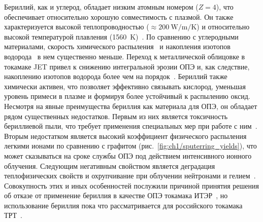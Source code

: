 Бериллий, как и углерод, обладает низким атомным номером ($Z=4$), что обеспечивает относительно хорошую совместимость с плазмой. Он также характеризуется высокой теплопроводностью (\( \approx \SI{200}{\watt\per\meter\per\K} \)) и относительно высокой температурой плавления (\SI{1560}{\kelvin})~\cite{Ho1974}. По сравнению с углеродными материалами, скорость химического распыления~\cite{Brezinsek2014} и накопления изотопов водорода~\cite{DeTemmerman2021} в нем существенно меньше. Переход к металлической облицовке в токамаке JET привел к снижению интегральной эрозии ОПЭ и, как следствие, накоплению изотопов водорода более чем на порядок~\cite{Brezinsek2015}. Бериллий также химически активен, что позволяет эффективно связывать кислород, уменьшая уровень примеси в плазме и формируя более устойчивый к распылению оксид. Несмотря на явные преимущества бериллия как материала для ОПЭ, он обладает рядом существенных недостатков. Первым из них является токсичность бериллиевой пыли, что требует применения специальных мер при работе с ним~\cite{Strupp2011}. Вторым недостатком является высокий коэффициент физического распыления легкими ионами по сравнению с графитом (рис.~\cref{fig:ch1/sputerring_yields}), что может сказываться на сроке службы ОПЭ под действием интенсивного ионного облучения. Следующим негативным свойством является деградация теплофизических свойств и охрупчивание при облучении нейтронами и гелием~\cite{Kesternich2003,Gilbert2012}. Совокупность этих и иных особенностей послужили причиной принятия решения об отказе от применение бериллия в качестве ОПЭ токамака ИТЭР~\cite{Barabaschi2025}, но использование бериллия пока что рассматривается для российского токамака ТРТ~\cite{Mazul2021,Piskarev2024}.

